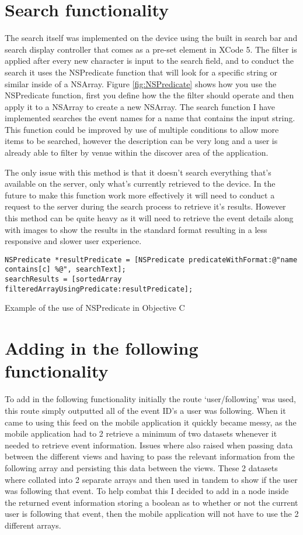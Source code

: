 	\section{Search functionality}
		The search itself was implemented on the device using the built in search bar and search display controller that comes as a pre-set element in XCode 5. The filter is applied after every new character is input to the search field, and to conduct the search it uses the NSPredicate function that will look for a specific string or similar inside of a NSArray. Figure \ref{fig:NSPredicate} shows how you use the NSPredicate function, first you  define how the the filter should operate and then apply it to a NSArray to create a new NSArray. The search function I have implemented searches the event names for a name that contains the input string. This function could be improved by use of multiple conditions to allow more items to be searched, however the description can be very long and a user is already able to filter by venue within the discover area of the application.

		The only issue with this method is that it doesn't search everything that's available on the server, only what's currently retrieved to the device. In the future to make this function work more effectively it will need to conduct a request to the server during the search process to retrieve it's results. However this method can be quite heavy as it will need to retrieve the event details along with images to show the results in the standard format resulting in a less responsive and slower user experience. 

		\begin{program}
			\begin{lstlisting}
NSPredicate *resultPredicate = [NSPredicate predicateWithFormat:@"name contains[c] %@", searchText];
searchResults = [sortedArray filteredArrayUsingPredicate:resultPredicate];
			\end{lstlisting}
			\caption{Example of the use of NSPredicate in Objective C}
			\label{fig:NSPredicate}
		\end{program}

	\section{Adding in the following functionality}
		To add in the following functionality initially the route `user/following' was used, this route simply outputted all of the event ID's a user was following. When it came to using this feed on the mobile application it quickly became messy, as the mobile application had to 2 retrieve a minimum of two datasets whenever it needed to retrieve event information. Issues where also raised when passing  data between the different views  and having to pass the relevant information from the following array and persisting this data between the views. These 2 datasets where collated into 2 separate arrays and then used in tandem to show if the user was following that event. To help combat this I decided to add in a node inside the returned event information storing a boolean as to whether or not the current user is following that event, then the mobile application will not have to use the 2 different arrays. 

